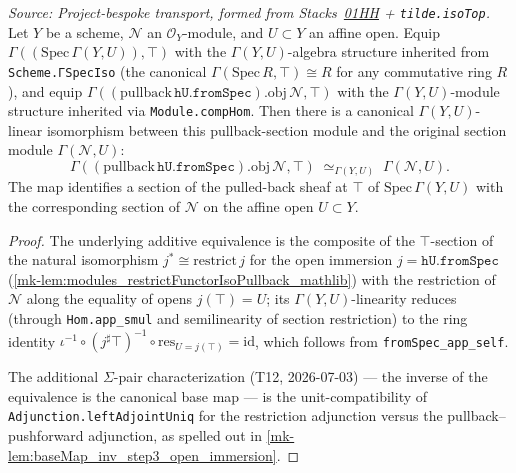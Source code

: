 \begin{lemma}\label{mk-lem:pullback_of_openImmersion_iso_restrict}
  \leanok

  \textit{Source: Project-bespoke transport, formed from
  Stacks~\href{https://stacks.math.columbia.edu/tag/01HH}{01HH} +
  \texttt{tilde.isoTop}.}
  Let \(Y\) be a scheme, \(\mathcal N\) an \(\mathcal O_Y\)-module, and
  \(U \subset Y\) an affine open. Equip \(\Gamma((\mathrm{Spec}\,\Gamma(Y, U)),
  \top)\) with the \(\Gamma(Y, U)\)-algebra structure inherited from
  \texttt{Scheme.ΓSpecIso} (the canonical
  \(\Gamma(\mathrm{Spec}\,R, \top) \cong R\) for any commutative ring \(R\)),
  and equip
  \(\Gamma((\text{pullback}\,\mathtt{hU.fromSpec}).\mathrm{obj}\,\mathcal N,
  \top)\) with the \(\Gamma(Y, U)\)-module structure inherited via
  \texttt{Module.compHom}. Then there is a canonical \(\Gamma(Y, U)\)-linear
  isomorphism between this pullback-section module and the original section
  module \(\Gamma(\mathcal N, U)\):
  \[
    \Gamma((\text{pullback}\,\mathtt{hU.fromSpec}).\mathrm{obj}\,\mathcal N,
      \top)
    \;\simeq_{\Gamma(Y, U)}\;
    \Gamma(\mathcal N, U).
  \]
  The map identifies a section of the pulled-back sheaf at \(\top\) of
  \(\mathrm{Spec}\,\Gamma(Y, U)\) with the corresponding section of
  \(\mathcal N\) on the affine open \(U \subset Y\).
\end{lemma}
\begin{proof}
  \leanok
  The underlying additive equivalence is the composite of the
  \(\top\)-section of the natural isomorphism
  \(j^{*} \cong \mathrm{restrict}\,j\) for the open immersion
  \(j = \mathtt{hU.fromSpec}\)
  (\ref{mk-lem:modules_restrictFunctorIsoPullback_mathlib}) with the
  restriction of \(\mathcal N\) along the equality of opens
  \(j(\top) = U\); its \(\Gamma(Y, U)\)-linearity reduces (through
  \texttt{Hom.app\_smul} and semilinearity of section restriction) to
  the ring identity
  \(\iota^{-1} \circ (j^{\sharp}\top)^{-1} \circ
    \mathrm{res}_{U = j(\top)} = \mathrm{id}\), which follows from
  \texttt{fromSpec\_app\_self}.

  The additional \(\Sigma\)-pair characterization (T12, 2026-07-03) —
  the inverse of the equivalence is the canonical base map — is the
  unit-compatibility of \texttt{Adjunction.leftAdjointUniq} for the
  restriction adjunction versus the pullback--pushforward adjunction,
  as spelled out in \ref{mk-lem:baseMap_inv_step3_open_immersion}.
\end{proof}



